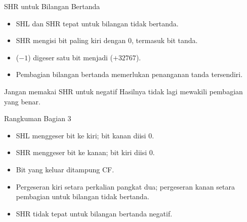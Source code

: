 \documentclass[aspectratio=169,11pt]{beamer}
\begin{document}
\begin{frame}{SHR untuk Bilangan Bertanda}
\small
\begin{itemize}
    \item SHL dan SHR tepat untuk bilangan tidak bertanda.

    \vspace{0.18em}
    \item SHR mengisi bit paling kiri dengan 0, termasuk bit tanda.

    \vspace{0.18em}
    \item {} ($-1$) digeser satu bit menjadi 
          ($+32767$).

    \vspace{0.18em}
    \item Pembagian bilangan bertanda memerlukan penanganan tanda
          tersendiri.
\end{itemize}

\vspace{0.25em}
\begin{alertblock}{Jangan memakai SHR untuk negatif}
\small Hasilnya tidak lagi mewakili pembagian yang benar.
\end{alertblock}
\end{frame}

\begin{frame}{Rangkuman Bagian 3}
\small
\begin{itemize}
    \item SHL menggeser bit ke kiri; bit kanan diisi 0.

    \vspace{0.15em}
    \item SHR menggeser bit ke kanan; bit kiri diisi 0.

    \vspace{0.15em}
    \item Bit yang keluar ditampung CF.

    \vspace{0.15em}
    \item Pergeseran kiri setara perkalian pangkat dua; pergeseran
          kanan setara pembagian untuk bilangan tidak bertanda.

    \vspace{0.15em}
    \item SHR tidak tepat untuk bilangan bertanda negatif.
\end{itemize}
\end{frame}
\end{document}
